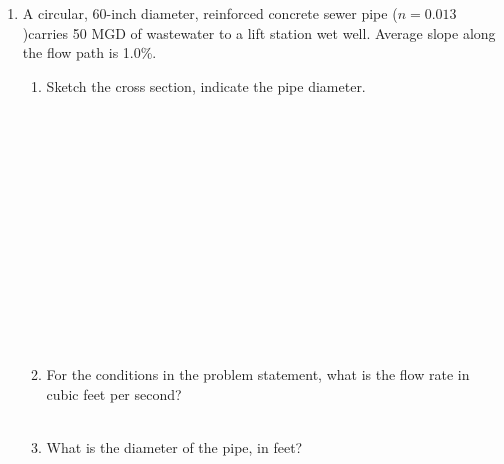 \documentclass[11pt]{article}
\begin{document}
\begin{enumerate}
\item A circular, 60-inch diameter, reinforced concrete sewer pipe ($n = 0.013$ )carries 50 MGD of wastewater to a lift station wet well.   Average slope along the flow path is 1.0\%.
\begin{enumerate} 
\item	Sketch the cross section, indicate the pipe diameter.
~\\
~\\
~\\
~\\
~\\
~\\
~\\
~\\
~\\
~\\
~\\
~\\
~\\
~\\
\item For the conditions in the problem statement, what is the flow rate in cubic feet per second?
~\\
~\\
\item What is the diameter of the pipe, in feet?
~\\
~\\



\end{enumerate}
\end{enumerate}
\end{document}

